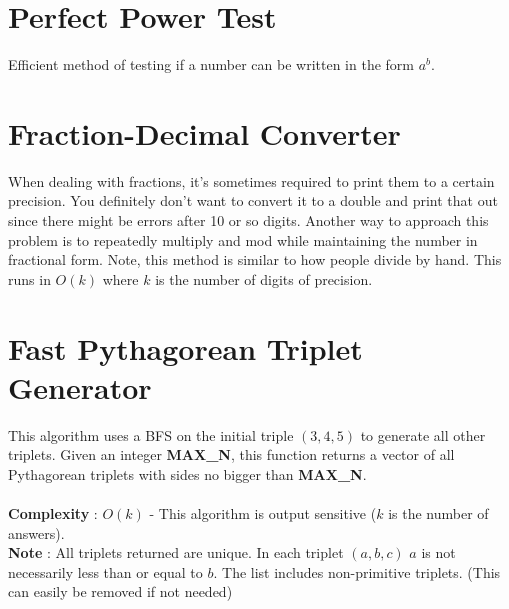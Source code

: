 	
	
	\section{Perfect Power Test}
	
	Efficient method of testing if a number can be written in the form $a^b$.
	
	
	
	\section{Fraction-Decimal Converter}
	
	When dealing with fractions, it’s sometimes required to print them to a 
	certain precision. You definitely don’t want to convert it to a double and 
	print that out since there might be errors after 10 or so digits. Another 
	way to approach this problem is to repeatedly multiply and mod while 
	maintaining the number in fractional form. Note, this method is similar
	to how people divide by hand. This runs in $O\left(k\right)$ where $k$ is the number of 
	digits of precision.
	
	
	
	\section{Fast Pythagorean Triplet Generator}
	
	This algorithm uses a BFS on the initial triple $\left(3,4,5\right)$ to 
	generate all other triplets. Given an integer {\bf MAX\_N}, this function
	returns a vector of all Pythagorean triplets with sides no bigger than 
	{\bf MAX\_N}. \\
	\ \\
	{\bf Complexity} : $O\left(k\right)$ - This algorithm is output sensitive
	($k$ is the number of answers).\\
	{\bf Note} : All triplets returned are unique. In each triplet 
	$\left(a,b,c\right)$ $a$ is not necessarily less than or equal to $b$. The 
	list includes non-primitive triplets. (This can easily be removed if not needed)\\
	
